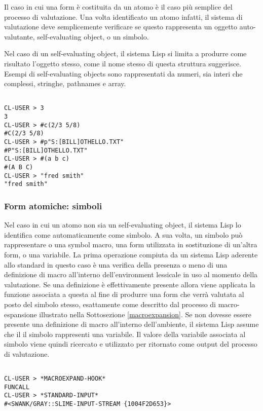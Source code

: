 Il caso in cui una form è costituita da un atomo è il caso più semplice del
processo di valutazione. Una volta identificato un atomo infatti, il sistema
di valutazione deve semplicemente verificare se questo rappresenta un oggetto
auto-valutante, self-evaluating object, o un simbolo.

Nel caso di un self-evaluating object, il sistema Lisp si limita a produrre
come risultato l’oggetto stesso, come il nome stesso di questa struttura
suggerisce. Esempi di self-evaluating objects sono rappresentati da numeri,
sia interi che complessi, stringhe, pathnames e array.

\begin{lstlisting}[caption=Esempi di form di tipo self-evaluating object]

CL-USER > 3
3
CL-USER > #c(2/3 5/8)
#C(2/3 5/8)
CL-USER > #p"S:[BILL]OTHELLO.TXT"
#P"S:[BILL]OTHELLO.TXT"
CL-USER > #(a b c)
#(A B C)
CL-USER > "fred smith"
"fred smith"

\end{lstlisting}

\subsubsection{Form atomiche: simboli}

Nel caso in cui un atomo non sia un self-evaluating object, il sistema Lisp lo
identifica come automaticamente come simbolo. A sua volta, un simbolo può
rappresentare o una symbol macro, una form utilizzata in sostituzione di
un’altra form, o una variabile. La prima operazione compiuta da un sistema Lisp
aderente allo standard in questo caso è una verifica della presenza o meno di
una definizione di macro all’interno dell’environment lessicale in uso al
momento della valutazione. Se una definizione è effettivamente presente allora
viene applicata la funzione associata a questa al fine di produrre una form che
verrà valutata al posto del simbolo stesso, esattamente come descritto dal
processo di macro-espansione illustrato nella Sottosezione \ref{macroexpansion}.
Se non dovesse essere presente una definizione di macro all’interno
dell’ambiente, il sistema Lisp assume che il il simbolo rappresenti una
variabile. Il valore della variabile associata al simbolo viene quindi ricercato
e utilizzato per ritornato come output del processo di valutazione.\\

\begin{lstlisting}[caption=Esempi di form di tipo symbol]

CL-USER > *MACROEXPAND-HOOK*
FUNCALL
CL-USER > *STANDARD-INPUT*
#<SWANK/GRAY::SLIME-INPUT-STREAM {1004F2D653}>

\end{lstlisting}


